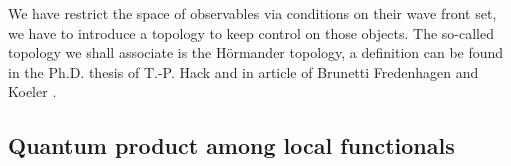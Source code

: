 \documentclass[11pt]{book}
\theoremstyle{break}
\begin{document}
\bigskip


We have restrict the space of observables via conditions on their wave front set, we have to introduce a topology to keep control on those objects. The so-called topology we shall associate is the Hörmander topology, a definition can be found in the Ph.D. thesis of T.-P. Hack \cite[Chapter III]{hack_backreaction_2010} and in article of Brunetti Fredenhagen and Koeler \cite{brunetti_microlocal_1996}.


\subsection{Quantum product among local functionals}
\end{document}

